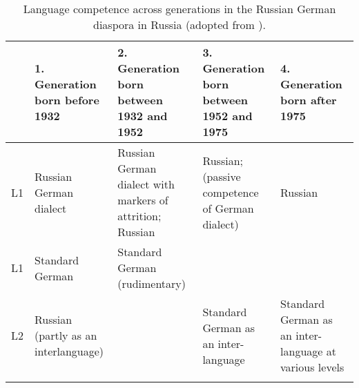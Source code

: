 \begin{table}\small
\begin{tabularx}{\textwidth}{l QQQQ}
	\lsptoprule
			& 1. Generation born before 1932 & 2. Generation born between 1932 and 1952 & 3. Generation born between 1952 and 1975 & 4. Generation born after 1975 \\\midrule
		L1 & Russian German dialect	& Russian German dialect with markers of attrition; Russian	& Russian; (passive competence of German dialect) 	& Russian\\\tablevspace
		L1 & Standard German	& Standard German (rudimentary)	& 	& \\\tablevspace
		L2 & Russian (partly as an interlanguage)	& 	& Standard German as an inter- language 	& Standard German as an inter- language at various levels\\
		\lspbottomrule
\end{tabularx}
\caption{Language competence across generations in the Russian German diaspora in Russia (adopted from \citealt{riehlTA}).\label{tab:3:2}}
\end{table}


